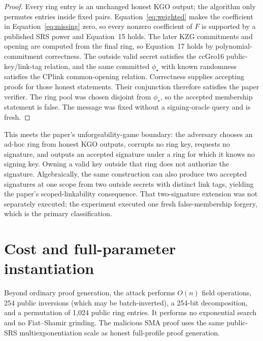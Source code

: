 \documentclass[10pt,a4paper]{article}
\begin{document}
\begin{proof}
Every ring entry is an unchanged honest KGO output; the algorithm only
permutes entries inside fixed pairs. Equation~\eqref{eq:weighted} makes the
coefficient in Equation~\eqref{eq:missing} zero, so every nonzero coefficient
of $F$ is supported by a published SRS power and Equation~15 holds. The later
KZG commitments and opening are computed from the final ring, so Equation~17
holds by polynomial-commitment correctness. The outside valid secret satisfies
the ccGro16 public-key/link-tag relation, and the same committed
$\phi_\star$ with known randomness satisfies the CPlink common-opening
relation. Correctness supplies accepting proofs for those honest statements.
Their conjunction therefore satisfies the paper verifier. The ring pool was
chosen disjoint from $\phi_\star$, so the accepted membership statement is
false. The message was fixed without a signing-oracle query and is fresh.
\end{proof}

This meets the paper's unforgeability-game boundary: the adversary chooses an
ad-hoc ring from honest KGO outputs, corrupts no ring key, requests no
signature, and outputs an accepted signature under a ring for which it knows
no signing key. Owning a valid key outside that ring does not authorize the
signature. Algebraically, the same construction can also produce two accepted
signatures at one scope from two outside secrets with distinct link tags,
yielding the paper's scoped-linkability consequence. That two-signature
extension was not separately executed; the experiment executed one fresh
false-membership forgery, which is the primary classification.

\section{Cost and full-parameter instantiation}

Beyond ordinary proof generation, the attack performs $O(n)$ field
operations, 254 public inversions (which may be batch-inverted), a 254-bit
decomposition, and a permutation of 1,024 public ring entries. It performs no
exponential search and no Fiat--Shamir grinding. The malicious SMA proof uses
the same public-SRS multiexponentiation scale as honest full-profile proof
generation.
\end{document}
